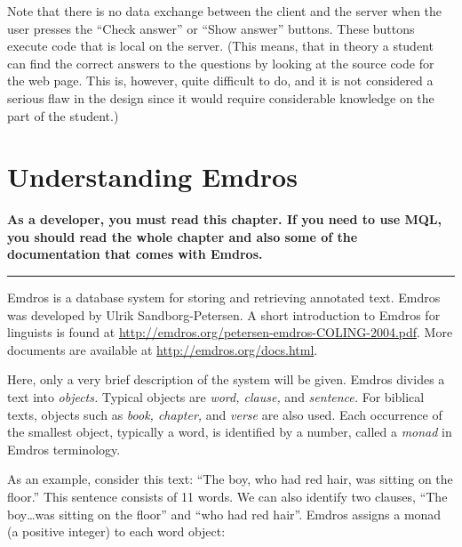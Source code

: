 \documentclass[11pt,oneside,a4paper]{memoir}
\begin{document}
Note that there is no data exchange between the client and the server when the user presses the
``Check answer'' or ``Show answer'' buttons. These buttons execute code that is local on the server.
(This means, that in theory a student can find the correct answers to the questions by looking at
the source code for the web page. This is, however, quite difficult to do, and it is not considered
a serious flaw in the design since it would require considerable knowledge on the part of the student.)


\chapter{Understanding Emdros}\label{chap-emdros-use}

\textbf{As a developer, you must read this chapter. If you need to use MQL, you should read the
  whole chapter and also some of the documentation that comes with Emdros.}

\plainbreak{3}

Emdros is a database system for storing and retrieving annotated text. Emdros was developed by Ulrik
Sandborg-Petersen. A short introduction to Emdros for linguists is
found at \url{http://emdros.org/petersen-emdros-COLING-2004.pdf}. More documents are available at
\url{http://emdros.org/docs.html}.

Here, only a very brief description of the system will be given. Emdros divides a text into
\emph{objects.} Typical objects are \emph{word, clause,} and
\emph{sentence.} For biblical texts, objects such as \emph{book, chapter,} and \emph{verse} are also
used. Each occurrence of the smallest object, typically a word, is identified by a number, called a
\emph{monad} in Emdros terminology.

As an example, consider this text: ``The boy, who had red hair, was sitting on the floor.'' This
sentence consists of 11 words. We can also identify two clauses, ``The boy\ldots was sitting on the
floor'' and ``who had red hair''. Emdros assigns a monad (a positive integer) to each word object:
\end{document}
